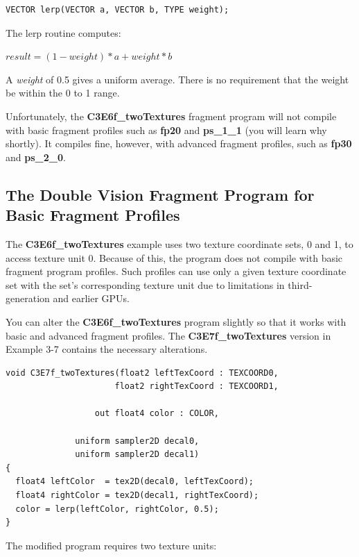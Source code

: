 \documentclass{book}
\begin{document}
\FloatBarrier
\begin{lstlisting}
VECTOR lerp(VECTOR a, VECTOR b, TYPE weight);
\end{lstlisting}
\FloatBarrier

The lerp routine computes:

\FloatBarrier
$
result = (1 - weight) * a + weight * b
$
\FloatBarrier

A \textit{weight} of 0.5 gives a uniform average. There is no requirement that the weight be within the 0 to 1 range.

Unfortunately, the \textbf{C3E6f_twoTextures} fragment program will not compile with basic fragment profiles such as \textbf{fp20} and \textbf{ps_1_1} (you will learn why shortly). It compiles fine, however, with advanced fragment profiles, such as \textbf{fp30} and \textbf{ps_2_0}.

\subsection*{The Double Vision Fragment Program for Basic Fragment Profiles}

The \textbf{C3E6f_twoTextures} example uses two texture coordinate sets, 0 and 1, to access texture unit 0. Because of this, the program does not compile with basic fragment program profiles. Such profiles can use only a given texture coordinate set with the set's corresponding texture unit due to limitations in third-generation and earlier GPUs.

You can alter the \textbf{C3E6f_twoTextures} program slightly so that it works with basic and advanced fragment profiles. The \textbf{C3E7f_twoTextures} version in Example 3-7 contains the necessary alterations.

\FloatBarrier
\begin{lstlisting}[caption=Example 3-7. The \textbf{C3E7f_twoTextures} Fragment Program]
void C3E7f_twoTextures(float2 leftTexCoord : TEXCOORD0,
                      float2 rightTexCoord : TEXCOORD1,

                  out float4 color : COLOR,

              uniform sampler2D decal0,
              uniform sampler2D decal1)
{
  float4 leftColor  = tex2D(decal0, leftTexCoord);
  float4 rightColor = tex2D(decal1, rightTexCoord);
  color = lerp(leftColor, rightColor, 0.5);
}
\end{lstlisting}
\FloatBarrier

The modified program requires two texture units:
\end{document}
